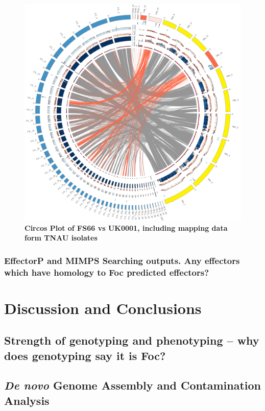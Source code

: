 \bigskip
\begin{figure}[htp!]
  \centering
  \includegraphics[width=15cm]{Figures/circos.png}
  \caption[Circos Plot of FS66 vs UK0001, including mapping data form TNAU isolates]{\textbf{Circos Plot of FS66 vs UK0001, including mapping data form TNAU isolates}}
  \label{TNAUCircos}
\end{figure}
\bigskip

\subsubsection{EffectorP and MIMPS Searching outputs. Any effectors which have homology to Foc predicted effectors?}


\newpage
\section{Discussion and Conclusions}
\subsection{Strength of genotyping and phenotyping – why does genotyping say it is Foc?}
\subsection{\textit{De novo} Genome Assembly and Contamination Analysis}


